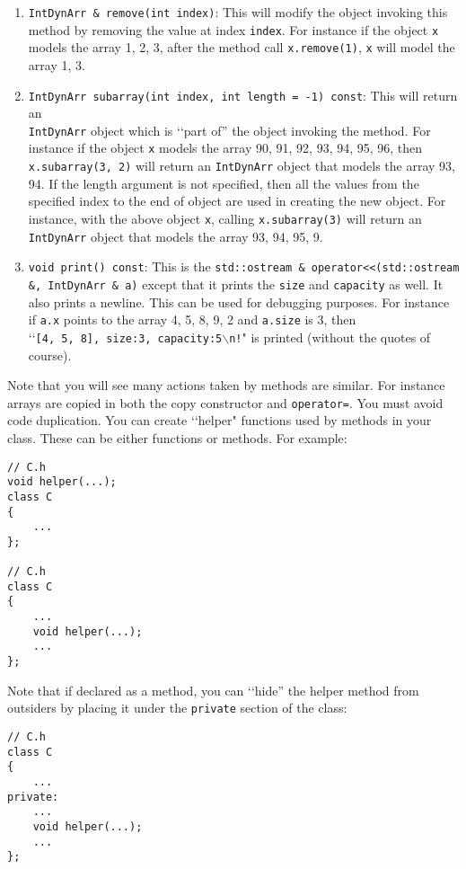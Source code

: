 \begin{enumerate}
\item \verb!IntDynArr & remove(int index)!: This will modify the object 
invoking this method by removing the value at index \verb!index!. For instance 
if the object \verb!x! models the array 1, 2, 3, after the method call 
\verb!x.remove(1)!, \verb!x! will model the array 1, 3.

\item \verb!IntDynArr subarray(int index, int length = -1) const!: This 
will return an \\ \verb!IntDynArr! object which is \lq\lq part of” the object 
invoking the method. For instance if the object \verb!x! models the 
array 90, 91, 92, 93, 94, 95, 96, then \verb!x.subarray(3, 2)! will 
return an \verb!IntDynArr! object that models the array 93, 94. If the 
length argument is not specified, then all the values from the specified 
index to the end of object are used in creating the new object. For 
instance, with the above object \verb!x!, calling  \verb!x.subarray(3)! 
will return an \verb!IntDynArr! object that models the array 93, 94, 95, 9.

\item \verb!void print() const!: This is the 
\texttt{std::ostream \& operator<<(std::ostream \&, IntDynArr \& a)} except that 
it prints the \verb!size! and \verb!capacity! as well. It also prints a newline. 
This can be used for debugging purposes. For instance if \verb!a.x! points to 
the array 4, 5, 8, 9, 2 and \verb!a.size! is 3, then
\lq\lq \texttt{[4,\ 5,\ 8],\ size:3,\ capacity:5$\backslash$n!}" is printed (without the quotes of 
course).

\end{enumerate}

Note that you will see many actions taken by methods are similar. For instance 
arrays are copied in both the copy constructor and \verb!operator=!. You must 
avoid code duplication. You can create \lq\lq helper" functions used by methods in 
your class. These can be either functions or methods. For example:
\begin{Verbatim}[frame=single]
// C.h
void helper(...);
class C
{
    ...
};

// C.h
class C
{
    ...
    void helper(...);
    ...
};
\end{Verbatim}

Note that if declared as a method, you can \lq\lq hide” the helper method 
from outsiders by placing it under the \verb!private! section of the class:

\begin{Verbatim}[frame=single]
// C.h
class C
{
    ...
private:
    ...
    void helper(...);
    ...
};
\end{Verbatim}

